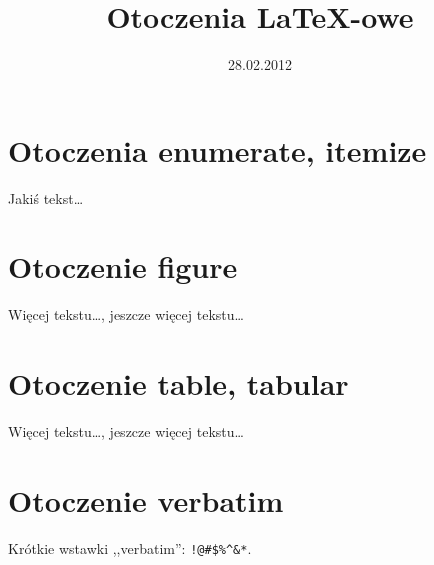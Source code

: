 \documentclass[a4paper,12pt]{article}
\title{Otoczenia \LaTeX-owe}
\date{28.02.2012}
\begin{document}
\pagestyle{empty}

\section*{Otoczenia enumerate, itemize}

Jakiś tekst\ldots

\section*{Otoczenie figure}

Więcej tekstu\ldots, jeszcze więcej tekstu\ldots

\section*{Otoczenie table, tabular}

Więcej tekstu\ldots, jeszcze więcej tekstu\ldots

\section*{Otoczenie verbatim}

Krótkie wstawki ,,verbatim'': \verb|!@#$%^&*|.
\end{document}
